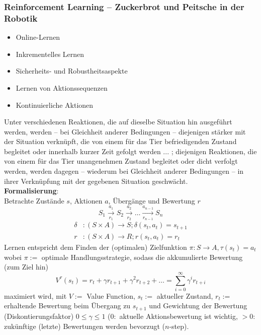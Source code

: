 \subsubsection{Reinforcement Learning -- Zuckerbrot und Peitsche in der Robotik}
\begin{itemize}
	\item Online-Lernen
	\item Inkrementelles Lernen
	\item Sicherheits- und Robustheitsaspekte
	\item Lernen von Aktionssequenzen
	\item Kontinuierliche Aktionen
\end{itemize}
Unter verschiedenen Reaktionen, die auf dieselbe Situation hin ausgeführt werden, werden -- bei Gleichheit anderer Bedingungen -- diejenigen stärker mit der Situation verknüpft, die von einem für das Tier befriedigenden Zustand begleitet oder innerhalb kurzer Zeit gefolgt werden ... ; diejenigen Reaktionen, die von einem für das Tier unangenehmen Zustand begleitet oder dicht verfolgt werden, werden dagegen -- wiederum bei Gleichheit anderer Bedingungen -- in ihrer Verknüpfung mit der gegebenen Situation geschwächt.\\
%
\textbf{Formalisierung}:\\
Betrachte Zustände $s$, Aktionen $a$, Übergänge und Bewertung $r$
\begin{equation}
	S_1 \overset{a_1}{\underset{r_1}{\rightarrow}} S_2 \overset{a_2}{\underset{r_2}{\rightarrow}} \ldots \overset{a_{n-1}}{\underset{r_{n-1}}{\rightarrow}} S_n
\end{equation}
\begin{align}
	\delta &: \left(S \times A \right) \rightarrow S ; \delta \left(s_t, a_t\right) = s_{t + 1} \\
	r &: \left(S \times A \right) \rightarrow R ; r\left(s_t, a_t\right) = r_t
\end{align}
Lernen entspricht dem Finden der (optimalen) Zielfunktion $\pi:S\rightarrow A, \tau(s_t)=a_t$ \\
wobei $\pi:=$ optimale Handlungsstrategie, sodass die akkumulierte Bewertung (zum Ziel hin) 
\begin{equation}
V^{\tau}(s_t) = r_t + \gamma r_{t+1} + \gamma^2 r_{t+2} + \ldots = \sum_{i = 0}^\infty \gamma^i r_{t+i}
\end{equation}
maximiert wird, mit $V:=$ Value Function, $s_t:=$ aktueller Zustand, $r_t:=$ erhaltende Bewertung beim Übergang zu $s_{t+1}$ und Gewichtung der Bewertung (Diskontierungsfaktor) $0 \leq \gamma \leq 1$ ($0:$ aktuelle Aktionsbewertung ist wichtig, $>0:$ zukünftige (letzte) Bewertungen werden bevorzugt ($n$-step).
